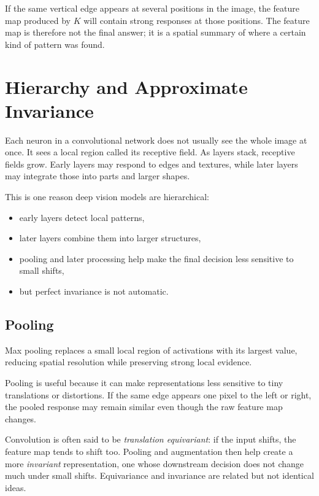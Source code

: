 \begin{example}
If the same vertical edge appears at several positions in the image, the feature map produced by $K$ will contain strong responses at those positions. The feature map is therefore not the final answer; it is a spatial summary of where a certain kind of pattern was found.
\end{example}

\section{Hierarchy and Approximate Invariance}

Each neuron in a convolutional network does not usually see the whole image at once. It sees a local region called its receptive field. As layers stack, receptive fields grow. Early layers may respond to edges and textures, while later layers may integrate those into parts and larger shapes.

This is one reason deep vision models are hierarchical:
\begin{itemize}[leftmargin=*]
\item early layers detect local patterns,
\item later layers combine them into larger structures,
\item pooling and later processing help make the final decision less sensitive to small shifts,
\item but perfect invariance is not automatic.
\end{itemize}

\subsection{Pooling}

\begin{definition}
Max pooling replaces a small local region of activations with its largest value, reducing spatial resolution while preserving strong local evidence.
\end{definition}

Pooling is useful because it can make representations less sensitive to tiny translations or distortions. If the same edge appears one pixel to the left or right, the pooled response may remain similar even though the raw feature map changes.

\begin{advancednote}
Convolution is often said to be \emph{translation equivariant}: if the input shifts, the feature map tends to shift too. Pooling and augmentation then help create a more \emph{invariant} representation, one whose downstream decision does not change much under small shifts. Equivariance and invariance are related but not identical ideas.
\end{advancednote}

